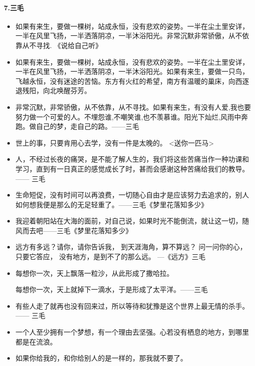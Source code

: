 \documentclass[UTF8,a4paper,8pt]{ctexart}
\begin{document}
 \paragraph{7.三毛}
 \begin{itemize}
 	\item 如果有来生，要做一棵树，站成永恒，没有悲欢的姿势。一半在尘土里安详，一半在风里飞扬，一半洒落阴凉，一半沐浴阳光。非常沉默非常骄傲，从不依靠从不寻找.   《说给自己听》
 	\item 如果有来生，要做一棵树，站成永恒，没有悲欢的姿势。一半在尘土里安详，一半在风里飞扬，一半洒落阴凉，一半沐浴阳光。如果有来生，要做一只鸟，飞越永恒，没有迷途的苦恼。东方有火红的希望，南方有温暖的巢床，向西逐退残阳，向北唤醒芬芳。
 	\item 非常沉默，非常骄傲，从不依靠，从不寻找。如果有来生，有没有人爱,我也要努力做一个可爱的人。不埋怨谁,不嘲笑谁,也不羡慕谁。阳光下灿烂,风雨中奔跑。做自己的梦，走自己的路。——三毛
 	
 	\item 世上的事，只要肯用心去学，没有一件是太晚的。 <送你一匹马>
 	
 	\item 人，不经过长夜的痛哭，是不能了解人生的，我们将这些苦痛当作一种功课和学习，直到有一日真正的感觉成长了时，甚而会感谢这种苦痛给我们的教导。—— 三毛
 	
 	\item 生命短促，没有时间可以再浪费，一切随心自由才是应该努力去追求的，别人如何想我便是那么的无足轻重了。——三毛《梦里花落知多少》
 	
 	\item 我迎着朝阳站在大海的面前，对自己说，如果时光不能倒流，就让这一切，随风而去吧——三毛《梦里花落知多少》
 	
 	\item 远方有多远？请你，请你告诉我， 到天涯海角，算不算远？ 问一问你的心，只要它答应， 没有地方，是到不了的那么远。 ---《远方》三毛
 	
 	\item 每想你一次，天上飘落一粒沙，从此形成了撒哈拉。
 	
 	每想你一次，天上就掉下一滴水，于是形成了太平洋。——三毛
 	
 	\item 有些人走了就再也没有回来过，所以等待和犹豫是这个世界上最无情的杀手。 —— 三毛
 	
 	\item 一个人至少拥有一个梦想，有一个理由去坚强。心若没有栖息的地方，到哪里都是在流浪。
 	
 	\item 如果你给我的，和你给别人的是一样的，那我就不要了。
 	

\end{itemize}
\end{document}
